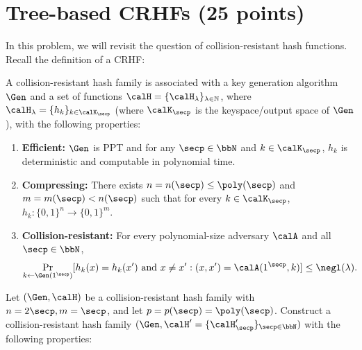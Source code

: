 \documentclass{article}
\begin{document}
\section{Tree-based CRHFs (25 points)}
In this problem, we will revisit the question of collision-resistant hash functions. Recall the definition of a CRHF:
\begin{definition}
    A collision-resistant hash family is associated with a key generation algorithm $\Gen$ and a set of functions $\calH = \{\calH_\lambda\}_{\lambda \in \mathbb{N}}$, where $\calH_\lambda = \{h_k\}_{k \in \calK_{\secp}}$ (where $\calK_{\secp}$ is the keyspace/output space of $\Gen$), with the following properties:
    \begin{enumerate}
        \item \textbf{Efficient:} $\Gen$ is PPT and for any $\secp \in \bbN$ and $k \in \calK_{\secp}$, $h_k$ is deterministic and computable in polynomial time.
        \item \textbf{Compressing:} There exists $n=n(\secp)\leq \poly(\secp)$ and $m=m(\secp)<n(\secp)$ such that for every $k \in \calK_{\secp}$, $h_k: \{0, 1\}^{n} \to \{0, 1\}^m$.
        \item \textbf{Collision-resistant:} For every polynomial-size adversary $\calA$ and all $\secp \in \bbN$,
        \begin{align*}
            \Pr_{k \gets \Gen(1^\secp)}[h_{k}(x) = h_k(x') \text{ and } x \neq x': (x, x') =\calA(1^{\secp}, k) ] \leq \negl(\lambda).
        \end{align*}
    \end{enumerate}
\end{definition}
Let $(\Gen, \calH)$ be a collision-resistant hash family with $n = 2\secp, m = \secp$, and let $p = p(\secp) = \poly(\secp)$. Construct a collision-resistant hash family $(\Gen, \calH' = \{\calH'_{\secp}\}_{\secp \in \bbN})$ with the following properties:
\end{document}
